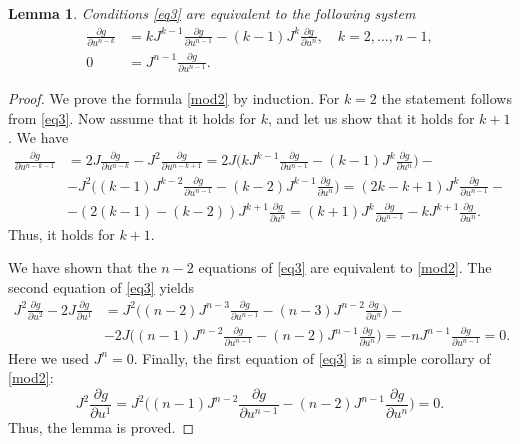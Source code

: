 \documentclass[12pt]{article}
\newtheorem{Lemma}{Lemma}[section]
\theoremstyle{remark}
\newcommand{\pd}[2]{\frac{\partial#1}{\partial#2}}
\begin{document}
\begin{Lemma}\label{lm4}
Conditions \eqref{eq3} are equivalent to the following system
\begin{equation}\label{mod2}
\begin{aligned}
\pd{g}{u^{n - k}} & = k J^{k - 1} \pd{g}{u^{n - 1}} - (k - 1) J^{k} \pd{g}{u^n}, \quad k = 2, \dots, n - 1, \\
0 & = J^{n - 1} \pd{g}{u^{n - 1}}.
\end{aligned}
\end{equation}   
\end{Lemma}
\begin{proof}
We prove the formula \eqref{mod2} by induction. For $k = 2$ the statement follows from \eqref{eq3}. Now assume that it holds for $k$, and let us show that it holds for $k + 1$. We have
$$
\begin{aligned}
\pd{g}{u^{n - k - 1}} & = 2 J \pd{g}{u^{n - k}} - J^2 \pd{g}{u^{n - k + 1}} = 2 J \Big( k J^{k - 1} \pd{g}{u^{n - 1}} - (k - 1) J^{k} \pd{g}{u^n} \Big) - \\ 
& - J^2 \Big( (k - 1) J^{k - 2} \pd{g}{u^{n - 1}} - (k - 2) J^{k - 1} \pd{g}{u^n}\Big) = (2k - k + 1) J^{k} \pd{g}{u^{n - 1}} - \\
& - (2(k-1)- (k-2)) J^{k + 1} \pd{g}{u^n} = (k + 1) J^{k} \pd{g}{u^{n - 1}} - k J^{k + 1} \pd{g}{u^n}.
\end{aligned}
$$
Thus, it holds for $k + 1$.   

We have shown that the $n - 2$ equations of \eqref{eq3} are equivalent to \eqref{mod2}. The second equation of \eqref{eq3} yields
$$
\begin{aligned}
J^{2} \pd{g}{u^2} - 2 J \pd{g}{u^1} & = J^{2} \Big( (n - 2) J^{n - 3} \pd{g}{u^{n - 1}} - (n - 3) J^{n - 2} \pd{g}{u^n} \Big) - \\
& - 2 J \Big( (n - 1) J^{n - 2} \pd{g}{u^{n - 1}} - (n - 2) J^{n  - 1} \pd{g}{u^{n}}\Big) = - n J^{n - 1} \pd{g}{u^{n - 1}} = 0.  
\end{aligned}
$$
Here we used $J^n = 0$. Finally, the first equation of \eqref{eq3} is a simple corollary of \eqref{mod2}:
$$
J^2 \pd{g}{u^1} = J^2 \Big( (n - 1) J^{n - 2} \pd{g}{u^{n - 1}} - (n - 2) J^{n - 1} \pd{g}{u^n} \Big) = 0.
$$
Thus, the lemma is proved.
\end{proof}
\end{document}
